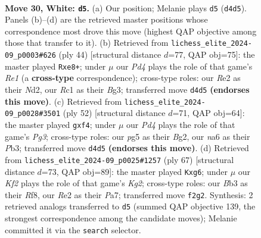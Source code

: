 \documentclass[11pt]{article}
\begin{document}
\clearpage

\begin{figure}[p]\centering
\begin{subfigure}{0.46\textwidth}\centering
\resizebox{\linewidth}{!}{%
\newchessgame
\chessboard[
  setfen={1rb5/pp4k1/n2q2p1/2p3pp/3P4/PB1Q1PP1/1P2RK1P/2R5 w - - 0 30},
  showmover=false,
  pgfstyle=straightmove, color=movearrow, markmove={d4-d5}
]}
\caption{}
\end{subfigure}\hfill
\begin{subfigure}{0.46\textwidth}\centering
\resizebox{\linewidth}{!}{%
\newchessgame
\chessboard[
  setfen={4r1k1/2p2pb1/1pq2npp/p7/P7/2P3BP/1PQN1PP1/4R1K1 w - - 0 23},
  showmover=false,
  pgfstyle=straightmove, color=movearrow, markmove={e1-e8}
]}
\caption{}
\end{subfigure}
\\[4pt]
\begin{subfigure}{0.46\textwidth}\centering
\resizebox{\linewidth}{!}{%
\newchessgame
\chessboard[
  setfen={3r2k1/1p1b3p/2pp1qp1/2n5/2PN1p2/1PQ3PP/P4PB1/4R1K1 w - - 1 27},
  showmover=false,
  pgfstyle=straightmove, color=movearrow, markmove={g3-f4}
]}
\caption{}
\end{subfigure}\hfill
\begin{subfigure}{0.46\textwidth}\centering
\resizebox{\linewidth}{!}{%
\newchessgame
\chessboard[
  setfen={5r2/p1p3k1/2pp2Pp/2q1rp2/2B1P3/1PN2RP1/P1PQ2K1/8 b - - 0 34},
  showmover=false,
  pgfstyle=straightmove, color=movearrow, markmove={g7-g6}
]}
\caption{}
\end{subfigure}
\caption{\textbf{Move 30, White: \texttt{d5}.} (a) Our position; Melanie plays \texttt{d5} (\texttt{d4d5}). Panels (b)--(d) are the retrieved master positions whose correspondence most drove this move (highest QAP objective among those that transfer to it). (b) Retrieved from \texttt{lichess\_elite\_2024-09\_p0003\#626} (ply 44) [structural distance $d$=77, QAP obj=75]: the master played \texttt{Rxe8+}; under $\mu$ our \emph{Pd4} plays the role of that game's \emph{Re1} (a \textbf{cross-type} correspondence); cross-type roles: our \emph{R}e2 as their \emph{N}d2, our \emph{R}c1 as their \emph{B}g3; transferred move \texttt{d4d5} \textbf{(endorses this move)}. (c) Retrieved from \texttt{lichess\_elite\_2024-09\_p0028\#3501} (ply 52) [structural distance $d$=71, QAP obj=64]: the master played \texttt{gxf4}; under $\mu$ our \emph{Pd4} plays the role of that game's \emph{Pg3}; cross-type roles: our \emph{p}g5 as their \emph{B}g2, our \emph{n}a6 as their \emph{P}b3; transferred move \texttt{d4d5} \textbf{(endorses this move)}. (d) Retrieved from \texttt{lichess\_elite\_2024-09\_p0025\#1257} (ply 67) [structural distance $d$=73, QAP obj=89]: the master played \texttt{Kxg6}; under $\mu$ our \emph{Kf2} plays the role of that game's \emph{Kg2}; cross-type roles: our \emph{B}b3 as their \emph{R}f8, our \emph{R}e2 as their \emph{P}a7; transferred move \texttt{f2g2}. Synthesis: 2 retrieved analogs transferred to \texttt{d5} (summed QAP objective 139, the strongest correspondence among the candidate moves); Melanie committed it via the \texttt{search} selector.}
\label{fig:thought-m58}
\end{figure}
\end{document}

